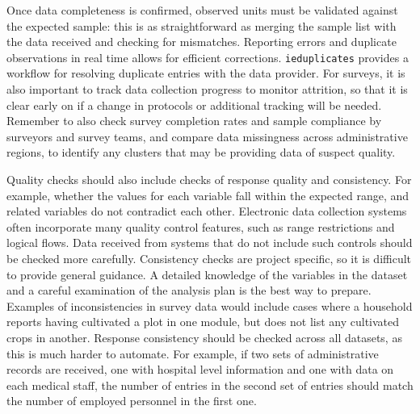 Once data completeness is confirmed,
observed units must be validated against the expected sample:
this is as straightforward as merging the sample list
with the data received and checking for mismatches.
Reporting errors and duplicate observations in real time allows for efficient corrections.
\texttt{ieduplicates}
provides a workflow for resolving duplicate entries with the data provider.
For surveys, it is also important to track data collection progress to  monitor attrition,
so that it is clear early on if a change in protocols or additional tracking will be needed.
Remember to also check survey completion rates
and sample compliance by surveyors and survey teams,
and compare data missingness across administrative regions,
to identify any clusters that may be providing data of suspect quality.

Quality checks should also include checks of response quality and consistency.
For example, whether the values for each variable fall within the expected range,
and related variables do not contradict each other.
Electronic data collection systems often incorporate many quality control features,
such as range restrictions and logical flows.
Data received from systems that do not include such controls should be checked more carefully.
Consistency checks are project specific, so it is difficult to provide general guidance.
A detailed knowledge of the variables in the dataset and a careful examination of the analysis plan
is the best way to prepare.
Examples of inconsistencies in survey data would include cases where 
a household reports having cultivated a plot in one module,
but does not list any cultivated crops in another.
Response consistency should be checked across all datasets, as this is much harder to automate.
For example, if two sets of administrative records are received,
one with hospital level information and one with data on each medical staff,
the number of entries in the second set of entries should match 
the number of employed personnel in the first one.

